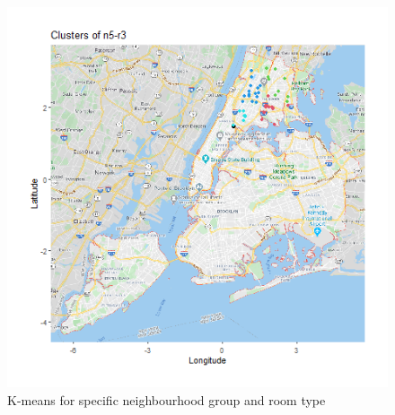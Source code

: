 \documentclass{FR16}
\begin{document}
\begin{itemize}
\begin{figure}[!htb]
\begin{minipage}{0.33\textwidth}
   \end{minipage}
   \begin{minipage}{0.33\textwidth}
     \centering
     \includegraphics[width=1\linewidth]{figures/clust-n5-r3.png} 
   \end{minipage}\hfill
           \caption{K-means for specific neighbourhood group and room type}\label{fig:25}

\end{figure}
\end{itemize}

\newpage
\end{document}
